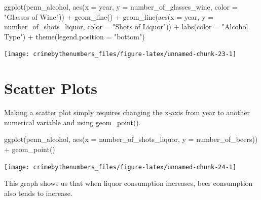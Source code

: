 \documentclass[
  12pt,
  openany]{book}
\newenvironment{Shaded}{\begin{snugshade}}{\end{snugshade}}
\newcommand{\AttributeTok}[1]{\textcolor[rgb]{0.61,0.61,0.61}{#1}}
\newcommand{\FunctionTok}[1]{\textcolor[rgb]{0,0,0}{#1}}
\newcommand{\NormalTok}[1]{#1}
\newcommand{\SpecialCharTok}[1]{\textcolor[rgb]{0,0,0}{#1}}
\newcommand{\StringTok}[1]{\textcolor[rgb]{0.5,0.5,0.5}{#1}}
\begin{document}
\begin{Shaded}
\begin{Highlighting}[]
\FunctionTok{ggplot}\NormalTok{(penn\_alcohol, }\FunctionTok{aes}\NormalTok{(}\AttributeTok{x =}\NormalTok{ year, }\AttributeTok{y =}\NormalTok{ number\_of\_glasses\_wine,}
                         \AttributeTok{color =} \StringTok{"Glasses of Wine"}\NormalTok{)) }\SpecialCharTok{+}
  \FunctionTok{geom\_line}\NormalTok{() }\SpecialCharTok{+}
  \FunctionTok{geom\_line}\NormalTok{(}\FunctionTok{aes}\NormalTok{(}\AttributeTok{x =}\NormalTok{ year, }\AttributeTok{y =}\NormalTok{ number\_of\_shots\_liquor,}
                \AttributeTok{color =} \StringTok{"Shots of Liquor"}\NormalTok{)) }\SpecialCharTok{+}
  \FunctionTok{labs}\NormalTok{(}\AttributeTok{color =} \StringTok{"Alcohol Type"}\NormalTok{) }\SpecialCharTok{+}
  \FunctionTok{theme}\NormalTok{(}\AttributeTok{legend.position =} \StringTok{"bottom"}\NormalTok{)}
\end{Highlighting}
\end{Shaded}

\begin{center}\texttt{[image: crimebythenumbers\_files/figure-latex/unnamed-chunk-23-1]} \end{center}

\hypertarget{scatter-plots}{%
\section{Scatter Plots}\label{scatter-plots}}

Making a scatter plot simply requires changing the x-axis from year to another numerical variable and using geom\_point().

\begin{Shaded}
\begin{Highlighting}[]
\FunctionTok{ggplot}\NormalTok{(penn\_alcohol, }\FunctionTok{aes}\NormalTok{(}\AttributeTok{x =}\NormalTok{ number\_of\_shots\_liquor,}
                         \AttributeTok{y =}\NormalTok{ number\_of\_beers)) }\SpecialCharTok{+}
  \FunctionTok{geom\_point}\NormalTok{()}
\end{Highlighting}
\end{Shaded}

\begin{center}\texttt{[image: crimebythenumbers\_files/figure-latex/unnamed-chunk-24-1]} \end{center}

This graph shows us that when liquor consumption increases, beer consumption also tends to increase.
\end{document}
